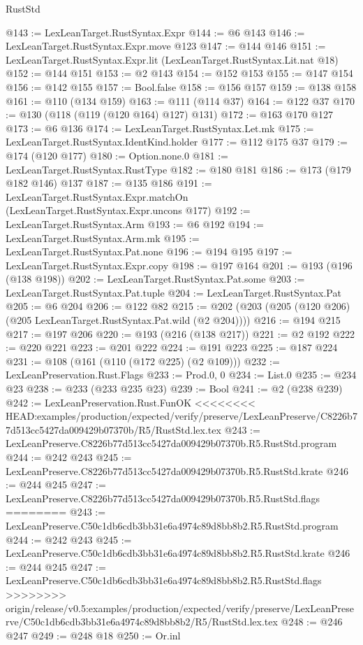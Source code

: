 \begin{lexlean}{RustStd}
\begin{coremodule}
{\begin{coremodule}
{{{{{{@143 := LexLeanTarget.RustSyntax.Expr
@144 := @6 @143
@146 := LexLeanTarget.RustSyntax.Expr.move @123
@147 := @144 @146
@151 := LexLeanTarget.RustSyntax.Expr.lit (LexLeanTarget.RustSyntax.Lit.nat @18)
@152 := @144 @151
@153 := @2 @143
@154 := @152 @153
@155 := @147 @154
@156 := @142 @155
@157 := Bool.false
@158 := @156 @157
@159 := @138 @158
@161 := @110 (@134 @159)
@163 := @111 (@114 @37)
@164 := @122 @37
@170 := @130 (@118 (@119 (@120 @164) @127) @131)
@172 := @163 @170 @127
@173 := @6 @136
@174 := LexLeanTarget.RustSyntax.Let.mk
@175 := LexLeanTarget.RustSyntax.IdentKind.holder
@177 := @112 @175 @37
@179 := @174 (@120 @177)
@180 := Option.none.{0}
@181 := LexLeanTarget.RustSyntax.RustType
@182 := @180 @181
@186 := @173 (@179 @182 @146) @137
@187 := @135 @186
@191 := LexLeanTarget.RustSyntax.Expr.matchOn (LexLeanTarget.RustSyntax.Expr.uncons @177)
@192 := LexLeanTarget.RustSyntax.Arm
@193 := @6 @192
@194 := LexLeanTarget.RustSyntax.Arm.mk
@195 := LexLeanTarget.RustSyntax.Pat.none
@196 := @194 @195
@197 := LexLeanTarget.RustSyntax.Expr.copy
@198 := @197 @164
@201 := @193 (@196 (@138 @198))
@202 := LexLeanTarget.RustSyntax.Pat.some
@203 := LexLeanTarget.RustSyntax.Pat.tuple
@204 := LexLeanTarget.RustSyntax.Pat
@205 := @6 @204
@206 := @122 @82
@215 := @202 (@203 (@205 (@120 @206) (@205 LexLeanTarget.RustSyntax.Pat.wild (@2 @204))))
@216 := @194 @215
@217 := @197 @206
@220 := @193 (@216 (@138 @217))
@221 := @2 @192
@222 := @220 @221
@223 := @201 @222
@224 := @191 @223
@225 := @187 @224
@231 := @108 (@161 (@110 (@172 @225) (@2 @109)))
@232 := LexLeanPreservation.Rust.Flags
@233 := Prod.{0, 0}
@234 := List.{0}
@235 := @234 @23
@238 := @233 (@233 @235 @23)
@239 := Bool
@241 := @2 (@238 @239)
@242 := LexLeanPreservation.Rust.FunOK
<<<<<<<< HEAD:examples/production/expected/verify/preserve/LexLeanPreserve/C8226b77d513cc5427da009429b07370b/R5/RustStd.lex.tex
@243 := LexLeanPreserve.C8226b77d513cc5427da009429b07370b.R5.RustStd.program
@244 := @242 @243
@245 := LexLeanPreserve.C8226b77d513cc5427da009429b07370b.R5.RustStd.krate
@246 := @244 @245
@247 := LexLeanPreserve.C8226b77d513cc5427da009429b07370b.R5.RustStd.flags
========
@243 := LexLeanPreserve.C50c1db6cdb3bb31e6a4974c89d8bb8b2.R5.RustStd.program
@244 := @242 @243
@245 := LexLeanPreserve.C50c1db6cdb3bb31e6a4974c89d8bb8b2.R5.RustStd.krate
@246 := @244 @245
@247 := LexLeanPreserve.C50c1db6cdb3bb31e6a4974c89d8bb8b2.R5.RustStd.flags
>>>>>>>> origin/release/v0.5:examples/production/expected/verify/preserve/LexLeanPreserve/C50c1db6cdb3bb31e6a4974c89d8bb8b2/R5/RustStd.lex.tex
@248 := @246 @247
@249 := @248 @18
@250 := Or.inl
}}}}}}
\end{coremodule}}
\end{coremodule}
\end{lexlean}
